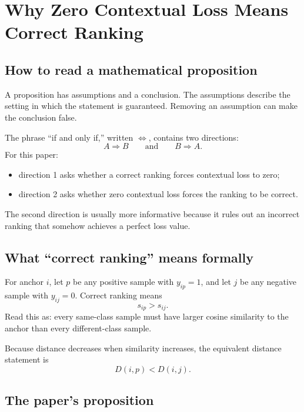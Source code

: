 \documentclass[11pt,oneside,openany]{book}
\theoremstyle{myplain}
\theoremstyle{definition}
\begin{document}
\chapter{Why Zero Contextual Loss Means Correct Ranking}
\label{chap:proof}

\section{How to read a mathematical proposition}

A proposition has assumptions and a conclusion. The assumptions describe the setting in which the statement is guaranteed. Removing an assumption can make the conclusion false.

The phrase ``if and only if,'' written $\Longleftrightarrow$, contains two directions:
\[
  A\Longrightarrow B
  \qquad\text{and}\qquad
  B\Longrightarrow A.
\]
For this paper:
\begin{itemize}[leftmargin=*]
  \item direction 1 asks whether a correct ranking forces contextual loss to zero;
  \item direction 2 asks whether zero contextual loss forces the ranking to be correct.
\end{itemize}
The second direction is usually more informative because it rules out an incorrect ranking that somehow achieves a perfect loss value.

\section{What ``correct ranking'' means formally}

For anchor $i$, let $p$ be any positive sample with $y_{ip}=1$, and let $j$ be any negative sample with $y_{ij}=0$. Correct ranking means
\[
  s_{ip}>s_{ij}.
\]
Read this as: every same-class sample must have larger cosine similarity to the anchor than every different-class sample.

Because distance decreases when similarity increases, the equivalent distance statement is
\[
  D(i,p)<D(i,j).
\]



\section{The paper's proposition}
\label{sec:proposition}
\end{document}
